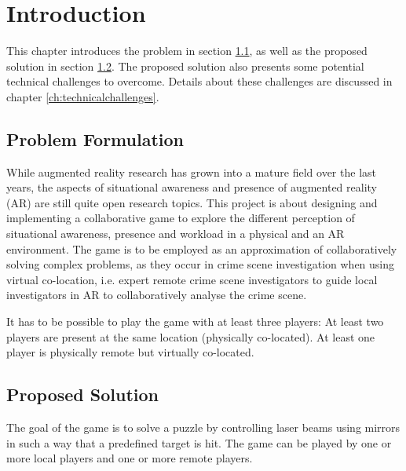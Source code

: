 \chapter{Introduction} \label{ch:introduction}
	This chapter introduces the problem in section \ref{sec:problem}, as well as
	the proposed solution in section \ref{sec:solution}. The proposed solution
	also presents some potential technical challenges to overcome. Details about 
	these challenges are discussed in chapter \ref{ch:technicalchallenges}.

	\section{Problem Formulation} \label{sec:problem}
		While augmented reality research has grown into a mature field over the 
		last years, the aspects of situational awareness and presence of 
		augmented reality (AR) are still quite open research topics. This 
		project is about designing and implementing a collaborative game to 
		explore the different perception of situational awareness, presence and 
		workload in a physical and an AR environment. The game is to be employed 
		as an approximation of collaboratively solving complex problems, as they 
		occur in crime scene investigation when using virtual co-location, i.e. 
		expert remote crime scene investigators to guide local investigators in 
		AR to collaboratively analyse the crime scene.
		
		It has to be possible to play the game with at least three players: At 
		least two players are present at the same location (physically 
		co-located). At least one player is physically remote but virtually 
		co-located. \cite{bepsys}
	
	\section{Proposed Solution} \label{sec:solution}
		The goal of the game is to solve a puzzle by controlling laser beams 
		using mirrors in such a way that a predefined target is hit. The game 
		can be played by one or more local players and one or more remote players.
		
